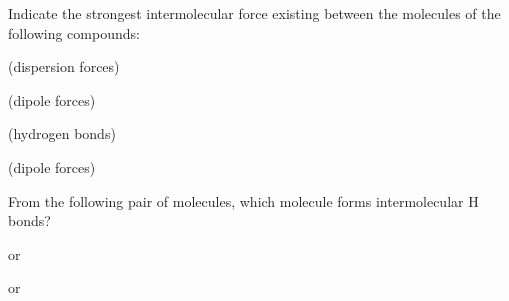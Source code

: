 \documentclass[main.tex]{subfiles}
\begin{document}
\begin{multicols*}{2}
\begin{question}[ID=\the\value{numA}]
Indicate the strongest intermolecular force existing between the molecules of the following compounds:
\begin{inparaenum}[(a)]
 \item {} %
 \item	{} %
 \item {} %
 \item {} %
\end{inparaenum}
\end{question}
\begin{solution}
\begin{inparaenum}[(a)]
 \item {}  (dispersion forces)
 \item	{}  (dipole forces)
 \item {}  (hydrogen bonds)
 \item {}  (dipole forces)
\end{inparaenum}\hspace{0.1cm}\end{solution}

\begin{question}[ID=\the\value{numA}]
From the following pair of molecules, which molecule forms intermolecular H bonds?
\begin{inparaenum}[(a)]
\item  {} or  
\item   {} or 
\end{inparaenum}
\end{question}
\begin{solution}
\begin{inparaenum}[(a)]
 \item {}
 \item {}
\end{inparaenum}\hspace{0.1cm}\end{solution}


\end{multicols*}
\end{document}
